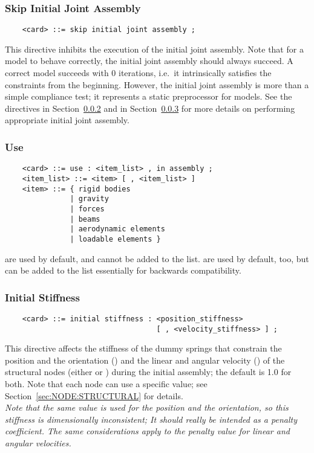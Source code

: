 \subsubsection{Skip Initial Joint Assembly}
\begin{verbatim}
    <card> ::= skip initial joint assembly ;
\end{verbatim}
This directive inhibits the execution of the initial joint assembly.
Note that for a model to behave correctly, the initial joint assembly
should always succeed.
A correct model succeeds with 0 iterations, i.e.\ it intrinsically 
satisfies the constraints from the beginning.
However, the initial joint assembly is more than a simple compliance
test; it represents a static preprocessor for models.
See the directives  in Section~\ref{sec:CONTROLDATA:USE}
and  in Section~\ref{sec:CONTROLDATA:INITIALSTIFFNESS}
for more details on performing appropriate initial joint assembly.



\subsubsection{Use}\label{sec:CONTROLDATA:USE}
\begin{verbatim}
    <card> ::= use : <item_list> , in assembly ;
    <item_list> ::= <item> [ , <item_list> ]
    <item> ::= { rigid bodies 
               | gravity
               | forces
               | beams
               | aerodynamic elements
               | loadable elements } 
\end{verbatim}
 are used by default, and cannot be added to the list.
 are used by default, too, but can be added to the list
essentially for backwards compatibility.

\subsubsection{Initial Stiffness}\label{sec:CONTROLDATA:INITIALSTIFFNESS}
\begin{verbatim}
    <card> ::= initial stiffness : <position_stiffness>
                                   [ , <velocity_stiffness> ] ;
\end{verbatim}
This directive affects the stiffness of the dummy springs that constrain
the position and the orientation ()
and the linear and angular velocity ()
of the structural nodes (either  or ) 
during the initial assembly; the default is 1.0 for both.
Note that each node can use a specific value; 
see Section~\ref{sec:NODE:STRUCTURAL} for details. \\
\emph{Note that the same value is used for the position and the orientation,
so this stiffness is dimensionally inconsistent; It should really 
be intended as a penalty coefficient.
The same considerations apply to the penalty value for linear 
and angular velocities.}

